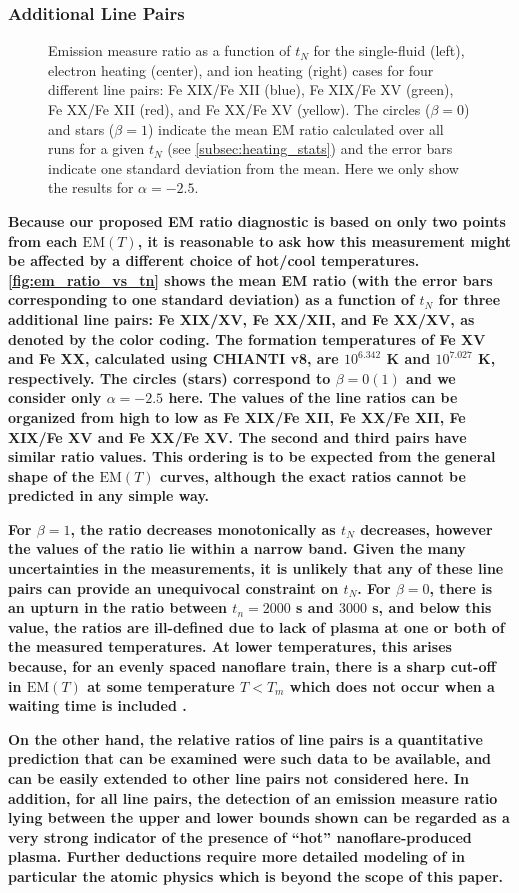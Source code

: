 \documentclass[preprint]{aastex}
\begin{document}
	\subsubsection{Additional Line Pairs}
	\label{subsubsec:add_line_pairs}
	\begin{figure*}
		\caption{Emission measure ratio as a function of $t_N$ for the single-fluid (left), electron heating (center), and ion heating (right) cases for four different line pairs: Fe XIX/Fe XII (blue), Fe XIX/Fe XV (green), Fe XX/Fe XII (red), and Fe XX/Fe XV (yellow). The circles ($\beta=0$) and stars ($\beta=1$) indicate the mean EM ratio calculated over all runs for a given $t_N$ (see \autoref{subsec:heating_stats}) and the error bars indicate one standard deviation from the mean. Here we only show the results for $\alpha=-2.5$.}
		\label{fig:em_ratio_vs_tn}
	\end{figure*}
	\par \textbf{Because our proposed EM ratio diagnostic is based on only two points from each $\mathrm{EM}(T)$, it is reasonable to ask how this measurement might be affected by a different choice of hot/cool temperatures. \autoref{fig:em_ratio_vs_tn} shows the mean EM ratio (with the error bars corresponding to one standard deviation) as a function of $t_N$ for three additional line pairs: Fe XIX/XV, Fe XX/XII, and Fe XX/XV, as denoted by the color coding. The formation temperatures of Fe XV and Fe XX, calculated using CHIANTI v8, are $10^{6.342}$ K and $10^{7.027}$ K, respectively. The circles (stars) correspond to $\beta=0(1)$ and we consider only $\alpha=-2.5$ here. The values of the line ratios can be organized from high to low as Fe XIX/Fe XII, Fe XX/Fe XII, Fe XIX/Fe XV and Fe XX/Fe XV. The second and third pairs have similar ratio values. This ordering is to be expected from the general shape of the $\mathrm{EM}(T)$ curves, although the exact ratios cannot be predicted in any simple way.}
%
	\par \textbf{For $\beta=1$, the ratio decreases monotonically as $t_N$ decreases, however the values of the ratio lie within a narrow band. Given the many uncertainties in the measurements, it is unlikely that any of these line pairs can provide an unequivocal constraint on $t_N$. For $\beta=0$, there is an upturn in the ratio between $t_n = 2000$ s and $3000$ s, and below this value, the ratios are ill-defined due to lack of plasma at one or both of the measured temperatures. At lower temperatures, this arises because, for an evenly spaced nanoflare train, there is a sharp cut-off in $\mathrm{EM}(T)$ at some temperature $T< T_m$ which does not occur when a waiting time is included \citep{cargill_active_2014}.} 
% 
	\par \textbf{On the other hand, the relative ratios of line pairs is a quantitative prediction that can be examined were such data to be available, and can be easily extended to other line pairs not considered here. In addition, for all line pairs, the detection of an emission measure ratio lying between the upper and lower bounds shown can be regarded as a very strong indicator of the presence of ``hot'' nanoflare-produced plasma. Further deductions require more detailed modeling of in particular the atomic physics which is beyond the scope of this paper.}
\end{document}
